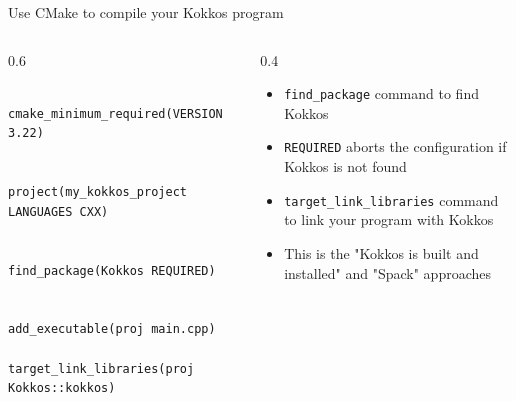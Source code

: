 \documentclass[
    aspectratio=169,
]{beamer}
\begin{document}
\begin{frame}[fragile]{Use CMake to compile your Kokkos program}
    \begin{columns}
        \begin{column}{0.6\linewidth}
            \begin{verbatim}
                cmake_minimum_required(VERSION 3.22)

                project(my_kokkos_project LANGUAGES CXX)

                find_package(Kokkos REQUIRED)

                add_executable(proj main.cpp)
                target_link_libraries(proj Kokkos::kokkos)
            \end{verbatim}
        \end{column}
        \begin{column}{0.4\linewidth}
            \begin{itemize}
                \item \texttt{find\_package} command to find Kokkos
                \item \texttt{REQUIRED} aborts the configuration if Kokkos is not found
                \item \texttt{target\_link\_libraries} command to link your program with Kokkos
                \item This is the "Kokkos is built and installed" and "Spack" approaches
            \end{itemize}
        \end{column}
    \end{columns}
\end{frame}
\end{document}

